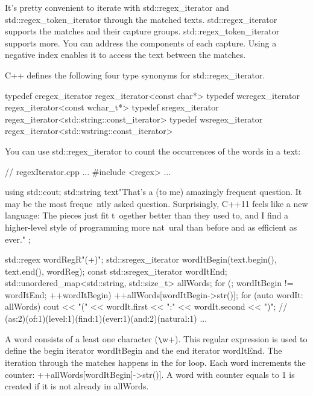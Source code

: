 

It’s pretty convenient to iterate with std::regex\_iterator and std::regex\_token\_iterator through the matched texts. std::regex\_iterator supports the matches and their capture groups. std::regex\_token\_iterator supports more. You can address the components of each capture. Using a negative index enables it to access the text between the matches.


C++ defines the following four type synonyms for std::regex\_iterator.

\begin{cpp}
typedef cregex_iterator regex_iterator<const char*>
typedef wcregex_iterator regex_iterator<const wchar_t*>
typedef sregex_iterator regex_iterator<std::string::const_iterator>
typedef wsregex_iterator regex_iterator<std::wstring::const_iterator>
\end{cpp}

You can use std::regex\_iterator to count the occurrences of the words in a text:


\begin{cpp}
// regexIterator.cpp
...
#include <regex>
...

using std::cout;
std::string text{"That's a (to me) amazingly frequent question. It may be the most freque\
ntly asked question. Surprisingly, C++11 feels like a new language: The pieces just fit t\
ogether better than they used to, and I find a higher-level style of programming more nat\
ural than before and as efficient as ever." };

std::regex wordReg{R"(\w+)"};
std::sregex_iterator wordItBegin(text.begin(), text.end(), wordReg);
const std::sregex_iterator wordItEnd;
std::unordered_map<std::string, std::size_t> allWords;
for (; wordItBegin != wordItEnd; ++wordItBegin){
	++allWords[wordItBegin->str()];
}
for (auto wordIt: allWords) cout << "(" << wordIt.first << ":"
								        << wordIt.second << ")";
					// (as:2)(of:1)(level:1)(find:1)(ever:1)(and:2)(natural:1) ...
\end{cpp}

A word consists of a least one character (\verb|\|w+). This regular expression is used to define the begin iterator wordItBegin and the end iterator wordItEnd. The iteration through the matches happens in the for loop. Each word increments the counter: ++allWords[wordItBegin]->str()]. A word with counter equals to 1 is created if it is not already in allWords.

